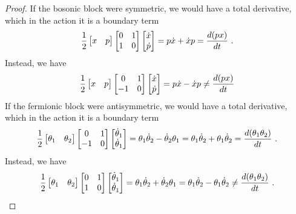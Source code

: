     \begin{proof}
        If the bosonic block were symmetric, we would have a total derivative, which in the action it is a boundary term
        \begin{equation*}
            \frac{1}{2} \begin{bmatrix} x & p \end{bmatrix} \begin{bmatrix}
                0 & 1 \\ 1 & 0
            \end{bmatrix} \begin{bmatrix} \dot x \\ \dot p \end{bmatrix} = p \dot x + \dot x p = \frac{d(px)}{dt} ~.
        \end{equation*}
        Instead, we have
        \begin{equation*}
            \frac{1}{2} \begin{bmatrix} x & p \end{bmatrix} \begin{bmatrix}
                0 & 1 \\ -1 & 0
            \end{bmatrix} \begin{bmatrix} \dot x \\ \dot p \end{bmatrix} = p \dot x - \dot x p \neq \frac{d(px)}{dt}
        \end{equation*}
        If the fermionic block were antisymmetric, we would have a total derivative, which in the action it is a boundary term
        \begin{equation*}
            \frac{1}{2} \begin{bmatrix} \theta_1 & \theta_2 \end{bmatrix} \begin{bmatrix}
                0 & 1 \\ -1 & 0
            \end{bmatrix} \begin{bmatrix} \dot \theta_1 \\ \dot \theta_1 \end{bmatrix} = \theta_1 \dot \theta_2 - \dot \theta_2 \theta_1 = \theta_1 \dot \theta_2 + \theta_1 \dot \theta_2 = \frac{d(\theta_1 \theta_2)}{dt} ~.
        \end{equation*}
        Instead, we have
        \begin{equation*}
            \frac{1}{2} \begin{bmatrix} \theta_1 & \theta_2 \end{bmatrix} \begin{bmatrix}
                0 & 1 \\ 1 & 0
            \end{bmatrix} \begin{bmatrix} \dot \theta_1 \\ \dot \theta_1 \end{bmatrix} = \theta_1 \dot \theta_2 + \dot \theta_2 \theta_1 = \theta_1 \dot \theta_2 - \theta_1 \dot \theta_2 \neq \frac{d(\theta_1 \theta_2)}{dt} ~.
        \end{equation*}
    \end{proof}
